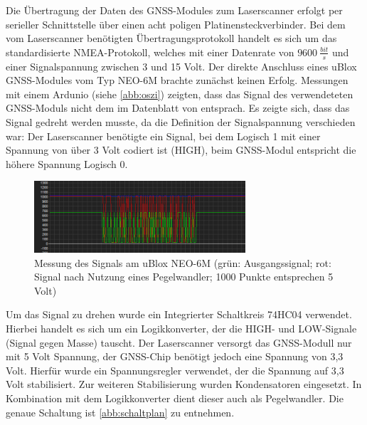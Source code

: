 \documentclass[a4paper,12pt,bibliography=totoc, listof=totoc,titlepage,pointlessnumbers]{scrreprt}
\begin{document}
Die Übertragung der Daten des GNSS-Modules zum Laserscanner erfolgt per serieller Schnittstelle über einen acht poligen Platinensteckverbinder. Bei dem vom Laserscanner benötigten Übertragungsprotokoll handelt es sich um das standardisierte NMEA-Protokoll, welches mit einer Datenrate von \(9600~\frac{bit}{s}\) und einer Signalspannung zwischen 3 und 15 Volt. Der direkte Anschluss eines uBlox GNSS-Modules vom Typ NEO-6M brachte zunächst keinen Erfolg. Messungen mit einem Ardunio (siehe \autoref{abb:oszi}) zeigten, dass das Signal des verwendeteten GNSS-Moduls nicht dem im Datenblatt von \citet[S. 3]{vlpInterface} entsprach. Es zeigte sich, dass das Signal gedreht werden musste, da die Definition der Signalspannung verschieden war: Der Laserscanner benötigte ein Signal, bei dem Logisch 1 mit einer Spannung von über 3 Volt \citep[S. 3]{vlpInterface} codiert ist (HIGH), beim GNSS-Modul entspricht  die höhere Spannung Logisch 0.

\begin{figure}
 \centering
 \includegraphics[width=0.7\textwidth]{img/oszi.png}
 \caption{Messung des Signals am uBlox NEO-6M (grün: Ausgangssignal; rot: Signal nach Nutzung eines Pegelwandler; 1000 Punkte entsprechen 5 Volt)}
 \label{abb:oszi}
\end{figure}

Um das Signal zu drehen wurde ein Integrierter Schaltkreis 74HC04 verwendet. Hierbei handelt es sich um ein Logikkonverter, der die HIGH- und LOW-Signale (Signal gegen Masse) tauscht. Der Laserscanner versorgt das GNSS-Modull nur mit 5 Volt Spannung, der GNSS-Chip benötigt jedoch eine Spannung von 3,3 Volt. Hierfür wurde ein Spannungsregler verwendet, der die Spannung auf 3,3 Volt stabilisiert. Zur weiteren Stabilisierung wurden Kondensatoren eingesetzt. In Kombination mit dem Logikkonverter dient dieser auch als Pegelwandler. Die genaue Schaltung ist \autoref{abb:schaltplan} zu entnehmen.
\end{document}
